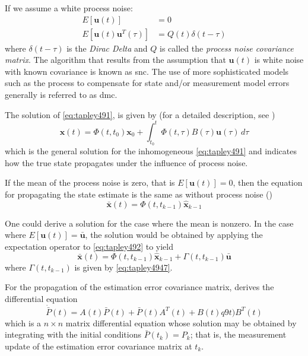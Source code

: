 If we assume a white process noise:
\begin{equation}
	\label{eq:tapley492}
	\begin{aligned}
		E \left[ \bm{u} (t) \right]                 & = 0                    \\
		E \left[ \bm{u} (t) \bm{u}^T (\tau) \right] & = Q(t) \delta (t-\tau)
	\end{aligned}
\end{equation}
where \(\delta (t-\tau)\) is the \emph{Dirac Delta} and \(Q\) is called the
\emph{process noise covariance matrix}. The algorithm that results from the assumption
that \( \bm{u} (t) \) is white noise with known covariance is known as \gls{snc}.
The use of more sophisticated models such as the process to compensate for state
and/or measurement model errors generally is referred to as \gls{dmc}.

The solution of \ref{eq:tapley491}, is given by (for a detailed description, see \cite{tapley})
\begin{equation}
	\label{eq:tapley4914}
	\bm{x} (t) = \Phi(t, t_0) \bm{x}_0 +
	\int_{t_0}^{t} \Phi(t, \tau ) B (\tau ) \bm{u} (\tau ) \, d\tau
\end{equation}
which is the general solution for the inhomogeneous \ref{eq:tapley491} and
indicates how the true state propagates under the influence of process noise.

If the mean of the process noise is zero, that is \(E \left[ \bm{u} (t) \right] = 0 \),
then the equation for propagating the state estimate is the same as without process noise
(\cite{tapley})
\begin{equation}
	\label{eq:tapley4919}
	\bar{\bm{x}} (t) = \Phi (t , t_{k-1} ) \hat{\bm{x}}_{k-1}
\end{equation}

One could derive a solution for the case where the mean is nonzero. In the case
where \(E \left[ \bm{u} (t) \right] = \bar{\bm{u}} \),
the solution would be obtained by applying the expectation operator to \ref{eq:tapley492}
to yield
\begin{equation}
	\label{eq:tapley4920}
	\bar{\bm{x}} (t) = \Phi (t , t_{k-1} ) \hat{\bm{x}}_{k-1} + \Gamma (t , t_{k-1} ) \bar{\bm{u}}
\end{equation}
where \(\Gamma (t , t_{k-1} )\) is given by \ref{eq:tapley4947}.

For the propagation of the estimation error covariance matrix, \cite{tapley} derives the
differential equation
\begin{equation}
	\label{eq:tapley4935}
	\dot{\bar{P}} (t) = A(t) \bar{P}(t) + \bar{P}(t) A^T (t) + B(t) q9t) B^T(t)
\end{equation}
which is a \(n \times n \) matrix differential equation whose solution may be obtained
by integrating with the initial conditions \(\bar{P} (t_k) = P_k\); that is, the
measurement update of the estimation error covariance matrix at \(t_k\).

